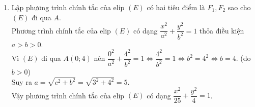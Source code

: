\begin{bt}
{\begin{enumerate}
\[{\begin{array}{*{20}{c}}
	  { {4^2} - 8b + c = 0} \\ 
	  {{{( - 3)}^2} + 6a + c = 0} \\ 
	  {{3^2} - 6a + c = 0} 
	\end{array}} \right.\]
	\[ \Rightarrow \left\{ {\begin{array}{*{20}{c}}
	  {- 8b + c =  - 16} \\ 
	  {6a + c =  - 9} \\ 
	  { -6a  + c =  - 9} 
	\end{array} \Rightarrow \left\{ {\begin{array}{*{20}{c}}
	  {a = 0} \\ 
	  {b =  \dfrac{7}{8}} \\ 
	  {c =  - 9} 
	\end{array}} \right.} \right.\]
	Phương trình đường tròn $(C)$ có tâm $I(0 ; \dfrac{7}{8})$ và bán kính\\ $R=\sqrt{0^2+ \left( \dfrac{7}{8}\right) ^2+9}= \dfrac{25}{8}$:
		\[(C): x^2+(y- \dfrac{7}{8})^2= \dfrac{625}{64}\]
\item Lập phương trình chính tắc của elip $(E)$ có hai tiêu điểm là $F_{1}, F_{2}$ sao cho $(E)$ đi qua $A$.\\
	Phương trình chính tắc của elip $(E)$ có dạng $\dfrac{x^{2}}{a^2}+\dfrac{y^{2}}{b^2}=1$ thỏa điều kiện $a>b>0$.\\
	Vì $(E)$ đi qua $A(0;4)$ nên $\dfrac{0^{2}}{a^2}+\dfrac{4^{2}}{b^2}=1 \Leftrightarrow \dfrac{4^{2}}{b^2}=1 \Leftrightarrow b^2=4^2 \Leftrightarrow b= 4.$ (do $b>0 $)\\
	Suy ra $a=\sqrt{c^2+b^2}=\sqrt{3^2+4^2}=5$.\\
	Vậy phương trình chính tắc của elip $(E)$ có dạng $\dfrac{x^{2}}{25}+\dfrac{y^{2}}{4}=1$.
\end{enumerate}
}
\end{bt}

